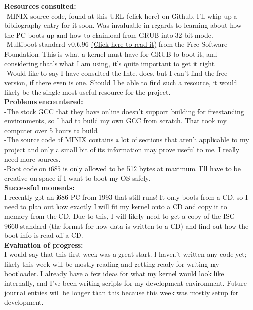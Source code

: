 \documentclass[11pt]{article}
\begin{document}
\textbf{Resources consulted:}\\
-MINIX source code, found at \href{https://github.com/Stichting-MINIX-Research-Foundation/minix}{this URL (click here)} on Github. I'll whip up a bibliography entry for it soon. Was invaluable in regards to learning about how the PC boots up and how to chainload from GRUB into 32-bit mode.\\
-Multiboot standard v0.6.96 \href{https://www.gnu.org/software/grub/manual/multiboot/multiboot.html}{(Click here to read it)} from the Free Software Foundation. This is what a kernel must have for GRUB to boot it, and considering that's what I am using, it's quite important to get it right. \\
-Would like to say I have consulted the Intel docs, but I can't find the free version, if there even is one. Should I be able to find such a resource, it would likely be the single most useful resource for the project.\\
\textbf{Problems encountered:}\\
-The stock GCC that they have online doesn't support building for freestanding environments, so I had to build my own GCC from scratch. That took my computer over 5 hours to build.\\
-The source code of MINIX contains a lot of sections that aren't applicable to my project and only a small bit of its information may prove useful to me. I really need more sources.\\
-Boot code on i686 is only allowed to be 512 bytes at maximum. I'll have to be creative on space if I want to boot my OS safely.\\
\textbf{Successful moments:}\\
I recently got an i686 PC from 1993 that still runs! It only boots from a CD, so I need to plan out how exactly I will fit my kernel onto a CD and copy it to memory from the CD. Due to this, I will likely need to get a copy of the ISO 9660 standard (the format for how data is written to a CD) and find out how the boot info is read off a CD.\\
\textbf{Evaluation of progress:}\\
I would say that this first week was a great start. I haven't written any code yet; likely this week will be mostly reading and getting ready for writing my bootloader. I already have a few ideas for what my kernel would look like internally, and I've been writing scripts for my development environment. Future journal entries will be longer than this because this week was mostly setup for development.
\end{document}
